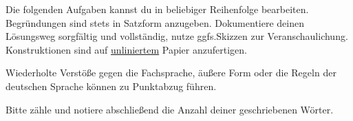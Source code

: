 {\footnotesize Die folgenden Aufgaben kannst du in beliebiger Reihenfolge bearbeiten. Begründungen sind stets in Satzform anzugeben. Dokumentiere deinen Lösungsweg sorgfältig und vollständig, nutze ggfs.\@ Skizzen zur Veranschaulichung. Konstruktionen sind auf \uline{unliniertem} Papier anzufertigen.

Wiederholte Verstöße gegen die Fachsprache, äußere Form oder die Regeln der deutschen Sprache können zu Punktabzug führen. 

Bitte zähle und notiere abschließend die Anzahl deiner geschriebenen Wörter.}\normalsize
